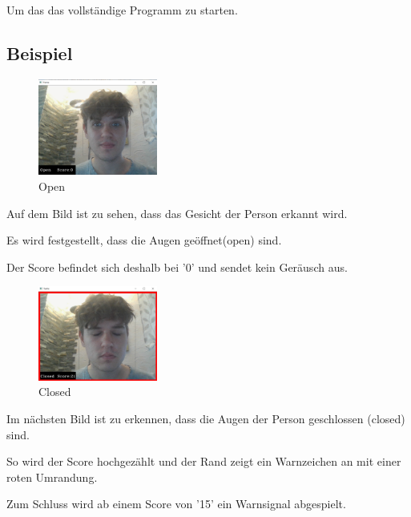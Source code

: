 Um das das vollständige Programm zu starten.\cite{b1}

\subsection{Beispiel}

\begin{figure}[htbp]
  \centering
     \includegraphics[width=0.35\textwidth]{Open.png}
     \caption{Open}
\end{figure}

Auf dem Bild ist zu sehen, dass das Gesicht der Person erkannt wird.

Es wird festgestellt, dass die Augen geöffnet(open) sind.

Der Score befindet sich deshalb bei '0' und sendet kein Geräusch aus.

\begin{figure}[htbp]
  \centering
     \includegraphics[width=0.35\textwidth]{Closed.png}
     \caption{Closed}
\end{figure}

Im nächsten Bild ist zu erkennen, dass die Augen der Person geschlossen (closed) sind.

So wird der Score hochgezählt und der Rand zeigt ein Warnzeichen an mit einer roten Umrandung.

Zum Schluss wird ab einem Score von '15' ein Warnsignal abgespielt.
\newline
\newline